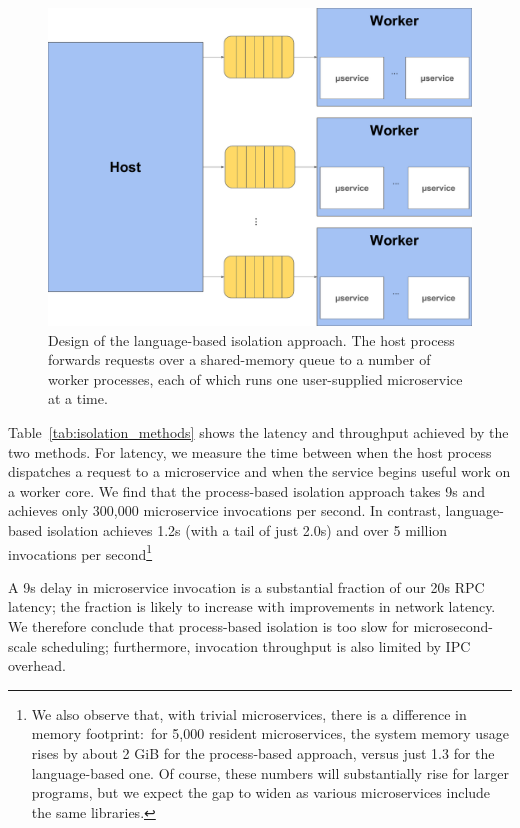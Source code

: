 \begin{figure}
\includegraphics[width=\columnwidth]{figs/system}
\caption{Design of the language-based isolation approach.  The host process forwards
requests over a shared-memory queue to a number of worker processes, each of which
runs one user-supplied microservice at a time.}
\label{fig:sysdesign}
\end{figure}

Table~\ref{tab:isolation_methods} shows the latency and throughput achieved
by the two methods. For latency, we measure the time between when the host
process dispatches a request to a microservice and when the service begins
useful work on a worker core. We find that the process-based isolation approach
takes 9\textmu{}s and achieves only 300,000 microservice invocations per
second. In contrast, language-based isolation achieves 1.2\textmu{}s (with a tail
of just 2.0\textmu{}s) and over 5 million invocations per second\footnote{We also
observe that, with trivial microservices, there is a difference in memory
footprint:\ for 5,000 resident microservices, the system memory usage rises by about
2 GiB for the process-based approach, versus just 1.3 for the language-based one.  Of
course, these numbers will substantially rise for larger programs, but we expect the
gap to widen as various microservices include the same libraries.}

A 9\textmu{}s delay in microservice invocation is a substantial fraction of our
20\textmu{}s RPC latency;  the fraction is likely to increase with
improvements in network latency. We therefore conclude that process-based
isolation is too slow for microsecond-scale scheduling; furthermore, invocation
throughput is also limited by IPC overhead.


